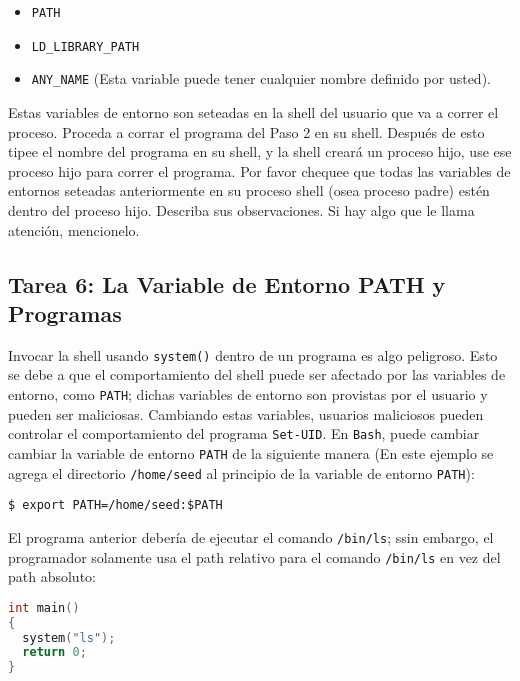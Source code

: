 \begin{itemize}[noitemsep]
\item {\tt PATH}
\item {\tt LD\_LIBRARY\_PATH}
\item {\tt ANY\_NAME} (Esta variable puede tener cualquier nombre definido por usted).
\end{itemize}

Estas variables de entorno son seteadas en la shell del usuario que va a correr el proceso. Proceda a corrar el programa \setuid del Paso 2 en su shell. Después de esto tipee el nombre del programa en su shell, y la shell creará un proceso hijo, use ese proceso hijo para correr el programa. Por favor chequee que todas las variables de entornos seteadas anteriormente en su proceso shell (osea proceso padre) estén dentro del proceso \setuid hijo. Describa sus observaciones. Si hay algo que le llama atención, mencionelo.



\subsection{Tarea 6: La Variable de Entorno PATH y Programas \setuid }

Invocar la shell usando {\tt system()} dentro de un programa \setuid es algo peligroso. Esto se debe a que el comportamiento del shell puede ser afectado por las variables de entorno, como {\tt PATH}; dichas variables de entorno son provistas por el usuario y pueden ser maliciosas. Cambiando estas variables, usuarios maliciosos pueden controlar el comportamiento del programa {\tt Set-UID}.
En {\tt Bash}, puede cambiar cambiar la variable de entorno {\tt PATH} de la siguiente manera (En este ejemplo se agrega el directorio {\tt /home/seed} al principio de la variable de entorno {\tt PATH}):


\begin{lstlisting}
$ export PATH=/home/seed:$PATH
\end{lstlisting}


El programa \setuid anterior debería de ejecutar el comando  {\tt /bin/ls}; ssin embargo, el programador solamente usa el path relativo para el comando  {\tt /bin/ls} en vez del path absoluto:

\begin{lstlisting}[language=C]
int main()
{
  system("ls");
  return 0;
}
\end{lstlisting}

